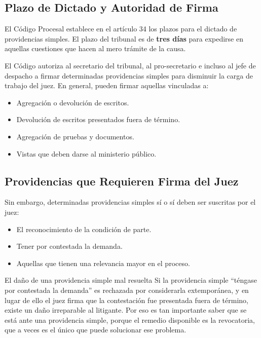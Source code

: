 \documentclass[12pt,oneside]{book}
\begin{document}
\subsection{Plazo de Dictado y Autoridad de Firma}

El Código Procesal establece en el artículo 34 los plazos para el dictado de providencias simples. El plazo del tribunal es de \textbf{tres días} para expedirse en aquellas cuestiones que hacen al mero trámite de la causa.

El Código autoriza al secretario del tribunal, al pro-secretario e incluso al jefe de despacho a firmar determinadas providencias simples para disminuir la carga de trabajo del juez. En general, pueden firmar aquellas vinculadas a:

\begin{itemize}
    \item Agregación o devolución de escritos.
    \item Devolución de escritos presentados fuera de término.
    \item Agregación de pruebas y documentos.
    \item Vistas que deben darse al ministerio público.
\end{itemize}

\subsection{Providencias que Requieren Firma del Juez}

Sin embargo, determinadas providencias simples sí o sí deben ser suscritas por el juez:

\begin{itemize}
    \item El reconocimiento de la condición de parte.
    \item Tener por contestada la demanda.
    \item Aquellas que tienen una relevancia mayor en el proceso.
\end{itemize}

\begin{example}{El daño de una providencia simple mal resuelta}
Si la providencia simple ``téngase por contestada la demanda'' es rechazada por considerarla extemporánea, y en lugar de ello el juez firma que la contestación fue presentada fuera de término, existe un daño irreparable al litigante. Por eso es tan importante saber que se está ante una providencia simple, porque el remedio disponible es la revocatoria, que a veces es el único que puede solucionar ese problema.
\end{example}
\end{document}
